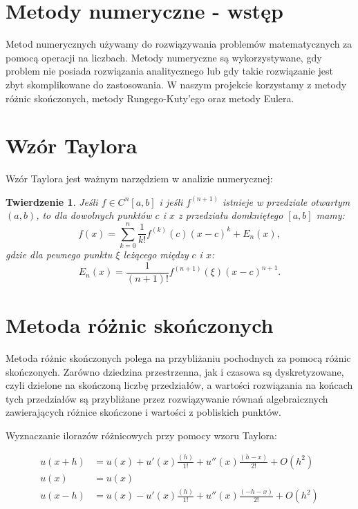 \documentclass[a4paper,12pt]{article}
\newtheorem{theorem}{Twierdzenie}
\begin{document}
\section{Metody numeryczne - wstęp}
Metod numerycznych używamy do rozwiązywania problemów matematycznych za pomocą operacji na liczbach. Metody numeryczne są wykorzystywane, gdy problem nie posiada rozwiązania analitycznego lub gdy takie rozwiązanie jest zbyt skomplikowane do zastosowania. W naszym projekcie korzystamy z metody różnic skończonych, metody Rungego-Kuty'ego oraz metody Eulera.

\section{Wzór Taylora}
Wzór Taylora jest ważnym narzędziem w analizie numerycznej:
\begin{theorem}
Jeśli $f \in C^n [a,b]$ i jeśli $f^{(n+1)}$ istnieje w przedziale otwartym $(a,b)$, to dla dowolnych punktów $c$ i $x$ z przedziału domkniętego $[a,b]$ mamy:
\begin{equation}
f(x)=\sum_{k=0}^n \frac{1}{k!}f^{(k)}(c)(x-c)^k + E_n (x),
\end{equation}
gdzie dla pewnego punktu $\xi$ leżącego między $c$ i $x$:
\begin{equation}
E_n (x) = \frac{1}{(n+1)!}f^{(n+1)}(\xi)(x-c)^{n+1}.
\end{equation}
\end{theorem}

\section{Metoda różnic skończonych}
Metoda różnic skończonych polega na przybliżaniu pochodnych za pomocą różnic skończonych. Zarówno dziedzina przestrzenna, jak i czasowa są dyskretyzowane, czyli dzielone na skończoną liczbę przedziałów, a wartości rozwiązania na końcach tych przedziałów są przybliżane przez rozwiązywanie równań algebraicznych zawierających różnice skończone i wartości z pobliskich punktów.

Wyznaczanie ilorazów różnicowych przy pomocy wzoru Taylora:

\begin{align*}
    u(x+h) &= u(x) + u'(x) \frac{(h)}{1!} + u''(x) \frac{(h-x)}{2!} + O(h^2) \\
    u(x) &= u(x) \\
    u(x-h) &= u(x) - u'(x) \frac{(h)}{1!} + u''(x) \frac{(-h-x)}{2!} + O(h^2)
\end{align*}
\end{document}
